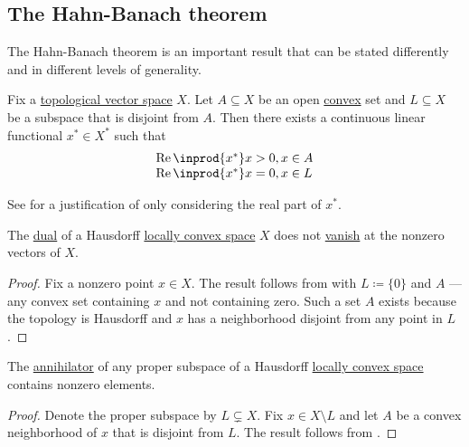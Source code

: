 \subsection{The Hahn-Banach theorem}\label{subsec:hahn_banach}

The Hahn-Banach theorem is an important result that can be stated differently and in different levels of generality.

\begin{theorem}\label{thm:geometric_hahn_banach}
  Fix a \hyperref[def:topological_vector_space]{topological vector space} \( X \). Let \( A \subseteq X \) be an open \hyperref[def:convex_hull]{convex} set and \( L \subseteq X \) be a subspace that is disjoint from \( A \). Then there exists a continuous linear functional \( x^* \in X^* \) such that
  \begin{equation*}
    \begin{array}{l}
      \real \inprod{x^*} x > 0, x \in A \\
      \real \inprod{x^*} x = 0, x \in L
    \end{array}
  \end{equation*}

  See  for a justification of only considering the real part of \( x^* \).
\end{theorem}

\begin{corollary}\label{thm:hahn_banach_implies_functionals_vanish_nowhere}
  The \hyperref[def:dual_vector_space]{dual} of a Hausdorff \hyperref[def:locally_convex_space]{locally convex space} \( X \) does not \hyperref[def:functions_vanish_nowhere]{vanish} at the nonzero vectors of \( X \).
\end{corollary}
\begin{proof}
  Fix a nonzero point \( x \in X \). The result follows from  with \( L \coloneqq \{ 0 \} \) and \( A \) --- any convex set containing \( x \) and not containing zero. Such a set \( A \) exists because the topology is Hausdorff and \( x \) has a neighborhood disjoint from any point in \( L \).
\end{proof}

\begin{corollary}\label{thm:hahn_banach_implies_annihilator_nontrivial}
  The \hyperref[def:vector_space_annihilator]{annihilator} of any proper subspace of a Hausdorff \hyperref[def:locally_convex_space]{locally convex space} contains nonzero elements.
\end{corollary}
\begin{proof}
  Denote the proper subspace by \( L \subsetneq X \). Fix \( x \in X \setminus L \) and let \( A \) be a convex neighborhood of \( x \) that is disjoint from \( L \). The result follows from .
\end{proof}

